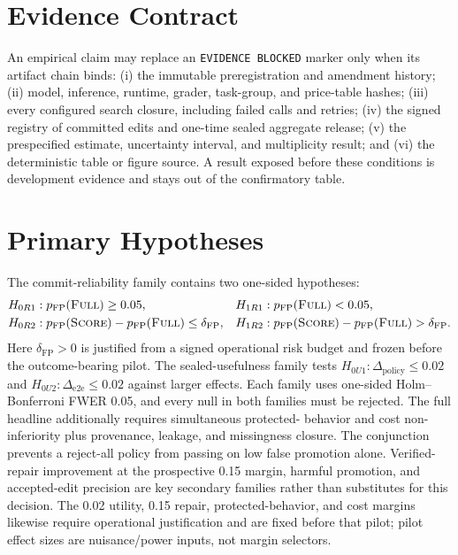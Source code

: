 \section{Evidence Contract}
\label{app:evidence-contract}

An empirical claim may replace an \texttt{EVIDENCE BLOCKED} marker only when its
artifact chain binds: (i) the immutable preregistration and amendment history;
(ii) model, inference, runtime, grader, task-group, and price-table hashes;
(iii) every configured search closure, including failed calls and retries;
(iv) the signed registry of committed edits and one-time sealed aggregate
release; (v) the
prespecified estimate, uncertainty interval, and multiplicity result; and (vi)
the deterministic table or figure source.  A result exposed before these
conditions is development evidence and stays out of the confirmatory table.

\section{Primary Hypotheses}
\label{app:hypotheses}

The commit-reliability family contains two one-sided hypotheses:
\begin{align*}
H_{0R1} &: p_{\mathrm{FP}}(\text{\textsc{Full}}) \geq 0.05,
  && H_{1R1}: p_{\mathrm{FP}}(\text{\textsc{Full}}) < 0.05,\\
H_{0R2} &: p_{\mathrm{FP}}(\text{\textsc{Score}})
 -p_{\mathrm{FP}}(\text{\textsc{Full}}) \leq \delta_{\mathrm{FP}},
  && H_{1R2}: p_{\mathrm{FP}}(\text{\textsc{Score}})
 -p_{\mathrm{FP}}(\text{\textsc{Full}}) > \delta_{\mathrm{FP}}.
\end{align*}
Here \(\delta_{\mathrm{FP}}>0\) is justified from a signed operational risk
budget and frozen before the outcome-bearing pilot.  The
sealed-usefulness family tests
\(H_{0U1}:\Delta_{\mathrm{policy}}\leq0.02\) and
\(H_{0U2}:\Delta_{\mathrm{e2e}}\leq0.02\) against larger effects.  Each family
uses one-sided Holm--Bonferroni FWER 0.05, and every null in both families must
be rejected.  The full headline additionally requires simultaneous protected-
behavior and cost non-inferiority plus provenance, leakage, and missingness
closure.  The conjunction prevents a reject-all policy from passing on low
false promotion alone.  Verified-repair improvement at the prospective 0.15
margin, harmful promotion, and accepted-edit precision are key secondary
families rather than substitutes for this decision.
The 0.02 utility, 0.15 repair, protected-behavior, and cost margins likewise
require operational justification and are fixed before that pilot; pilot effect
sizes are nuisance/power inputs, not margin selectors.

